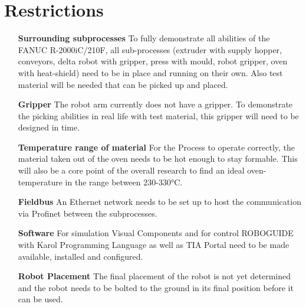 
\chapter{Restrictions}

\begin{itemize}[leftmargin=5cm]
	\item[\textbf{Surrounding subprocesses}] To fully demonstrate all abilities of the  FANUC R-2000iC/210F, all sub-processes (extruder with supply hopper, conveyors, delta robot with gripper, press with mould, robot gripper, oven with heat-shield) need to be in place and running on their own. Also test material will be needed that can be picked up and placed.
	\item[\textbf{Gripper}] The robot arm currently does not have a gripper. To demonstrate the picking abilities in real life with test material, this gripper will need to be designed in time.
	\item[\textbf{Temperature range of material}] For the Process to operate correctly, the material taken out of the oven needs to be hot enough to stay formable. This will also be a core point of the overall research to find an ideal oven-temperature in the range between 230-330°C.
	\item[\textbf{Fieldbus}] An Ethernet network needs to be set up to host the communication via Profinet between the subprocesses.
	\item[\textbf{Software}] For simulation Visual Components and for control ROBOGUIDE with Karol Programming Language as well as TIA Portal need to be made available, installed and configured. 
	\item[\textbf{Robot Placement}] The final placement of the robot is not yet determined and the robot needs to be bolted to the ground in its final position before it can be used.
\end{itemize}
